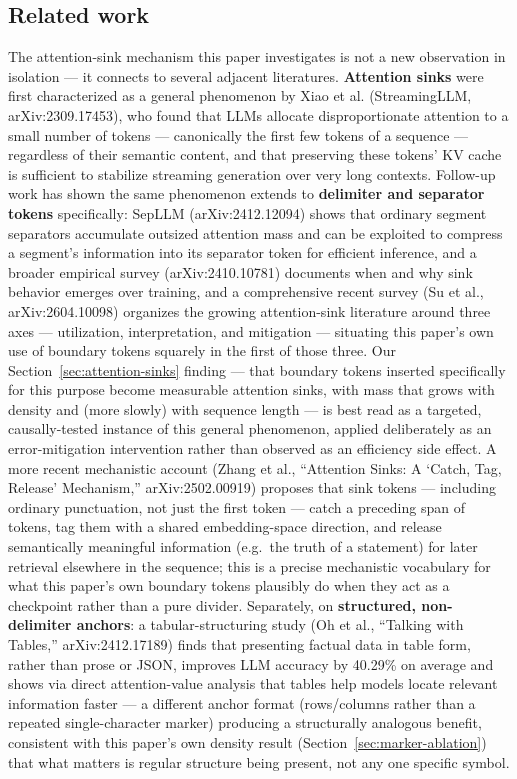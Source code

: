 \documentclass[11pt]{article}
\begin{document}
\subsection{Related work}

The attention-sink mechanism this paper investigates is not a new observation in isolation --- it connects to several adjacent literatures. \textbf{Attention sinks} were first characterized as a general phenomenon by Xiao et al. (StreamingLLM, arXiv:2309.17453), who found that LLMs allocate disproportionate attention to a small number of tokens --- canonically the first few tokens of a sequence --- regardless of their semantic content, and that preserving these tokens' KV cache is sufficient to stabilize streaming generation over very long contexts. Follow-up work has shown the same phenomenon extends to \textbf{delimiter and separator tokens} specifically: SepLLM (arXiv:2412.12094) shows that ordinary segment separators accumulate outsized attention mass and can be exploited to compress a segment's information into its separator token for efficient inference, and a broader empirical survey (arXiv:2410.10781) documents when and why sink behavior emerges over training, and a comprehensive recent survey (Su et al., arXiv:2604.10098) organizes the growing attention-sink literature around three axes --- utilization, interpretation, and mitigation --- situating this paper's own use of boundary tokens squarely in the first of those three. Our Section~\ref{sec:attention-sinks} finding --- that boundary tokens inserted specifically for this purpose become measurable attention sinks, with mass that grows with density and (more slowly) with sequence length --- is best read as a targeted, causally-tested instance of this general phenomenon, applied deliberately as an error-mitigation intervention rather than observed as an efficiency side effect. A more recent mechanistic account (Zhang et al., ``Attention Sinks: A `Catch, Tag, Release' Mechanism,'' arXiv:2502.00919) proposes that sink tokens --- including ordinary punctuation, not just the first token --- catch a preceding span of tokens, tag them with a shared embedding-space direction, and release semantically meaningful information (e.g.\ the truth of a statement) for later retrieval elsewhere in the sequence; this is a precise mechanistic vocabulary for what this paper's own boundary tokens plausibly do when they act as a checkpoint rather than a pure divider. Separately, on \textbf{structured, non-delimiter anchors}: a tabular-structuring study (Oh et al., ``Talking with Tables,'' arXiv:2412.17189) finds that presenting factual data in table form, rather than prose or JSON, improves LLM accuracy by 40.29\% on average and shows via direct attention-value analysis that tables help models locate relevant information faster --- a different anchor format (rows/columns rather than a repeated single-character marker) producing a structurally analogous benefit, consistent with this paper's own density result (Section~\ref{sec:marker-ablation}) that what matters is regular structure being present, not any one specific symbol.
\end{document}
